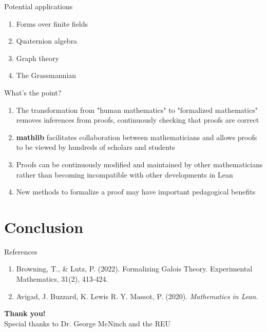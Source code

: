 \documentclass[xcolor=dvipsnames]{beamer}
\begin{document}
\begin{frame}{Potential applications}
\begin{enumerate}
\item Forms over finite fields
\item Quaternion algebra
\item Graph theory
\item The Grassmannian
\end{enumerate}
\end{frame}

\begin{frame}{What's the point?}

\begin{enumerate}
   \item The transformation from "human mathematics" to "formalized mathematics" removes inferences from proofs, continuously checking that proofs are correct
   \item \textbf{mathlib} facilitates collaboration between mathematicians and allows proofs to be viewed by hundreds of scholars and students
   \item Proofs can be continuously modified and maintained by other mathematicians rather than becoming incompatible with other developments in Lean
   \item New methods to formalize a proof may have important pedagogical benefits
\end{enumerate}
\end{frame}

\section{Conclusion}

\begin{frame}{References}
\begin{enumerate}
\item Browning, T., \& Lutz, P. (2022). Formalizing Galois Theory. Experimental Mathematics, 31(2), 413-424.
\item Avigad, J. Buzzard, K. Lewis R. Y. Massot, P. (2020). \textit{Mathematics in Lean}. 
\end{enumerate}
\end{frame}

\begin{frame}
	    \begin{center}
	        \textbf{Thank you!}\\
	        
	        Special thanks to Dr. George McNinch and the REU
         \bigbreak
         \LARGE
       
	    \end{center}
	\end{frame}
\end{document}

